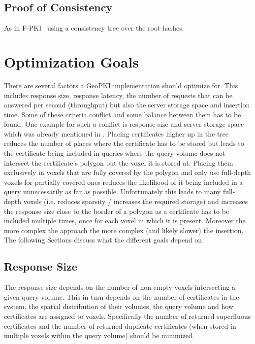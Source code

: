 \documentclass[10pt,conference,compsocconf]{IEEEtran}
\begin{document}
\subsection{Proof of Consistency}
\label{sec:data-structure:consistency}
As in F-PKI~\cite{chuat_f-pki_2022} using a consistency tree over the root hashes.

\section{Optimization Goals}
\label{sec:optimization-goals}

There are several factors a GeoPKI implementation should optimize for. This includes response size, response latency, the number of requests that can be answered per second (throughput) but also the server storage space and insertion time.
Some of these criteria conflict and some balance between them has to be found.
One example for such a conflict is response size and server storage space which was already mentioned in .
Placing certificates higher up in the tree reduces the number of places where the certificate has to be stored but leads to the certificate being included in queries where the query volume does not intersect the certificate's polygon but the voxel it is stored at.
Placing them exclusively in voxels that are fully covered by the polygon and only use full-depth voxels for partially covered ones reduces the likelihood of it being included in a query unnecessarily as far as possible.
Unfortunately this leads to many full-depth voxels (i.e. reduces sparsity / increases the required storage) and increases the response size close to the border of a polygon as a certificate has to be included multiple times, once for each voxel in which it is present.
Moreover the more complex the approach the more complex (and likely slower) the insertion.
The following Sections discuss what the different goals depend on.

\subsection{Response Size}
The response size depends on the number of non-empty voxels intersecting a given query volume.
This in turn depends on the number of certificates in the system, the spatial distribution of their volumes, the query volume and how certificates are assigned to voxels.
Specifically the number of returned superfluous certificates and the number of returned duplicate certificates (when stored in multiple voxels within the query volume) should be minimized.
\end{document}
